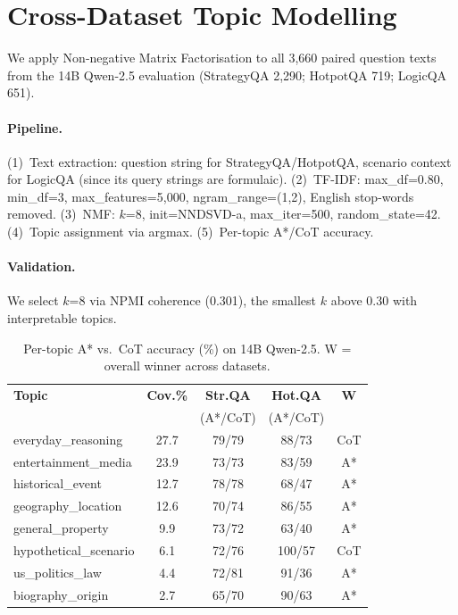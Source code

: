 \documentclass[11pt]{article}
\begin{document}
{%


\section{Cross-Dataset Topic Modelling}
\label{app:topics}

We apply Non-negative Matrix Factorisation \cite[NMF;][]{lee1999learning} to all 3,660 paired question texts from the 14B Qwen-2.5 evaluation (StrategyQA 2,290; HotpotQA 719; LogicQA 651).

\paragraph{Pipeline.} (1)~Text extraction: question string for StrategyQA/HotpotQA, scenario context for LogicQA (since its query strings are formulaic). (2)~TF-IDF: max\_df=0.80, min\_df=3, max\_features=5,000, ngram\_range=(1,2), English stop-words removed. (3)~NMF: $k$=8, init=NNDSVD-a, max\_iter=500, random\_state=42. (4)~Topic assignment via argmax. (5)~Per-topic A*/CoT accuracy.

\paragraph{Validation.} We select $k$=8 via NPMI coherence (0.301), the smallest $k$ above 0.30 with interpretable topics.

\begin{table}[ht]
\centering
\small
\setlength{\tabcolsep}{3pt}
\begin{tabular}{lcccc}
\toprule
\textbf{Topic} & \textbf{Cov.\%} & \textbf{Str.QA} & \textbf{Hot.QA} & \textbf{W} \\
& & (A*/CoT) & (A*/CoT) & \\
\midrule
everyday\_reasoning & 27.7 & 79/79 & 88/73 & CoT \\
entertainment\_media & 23.9 & 73/73 & 83/59 & A* \\
historical\_event & 12.7 & 78/78 & 68/47 & A* \\
geography\_location & 12.6 & 70/74 & 86/55 & A* \\
general\_property & 9.9 & 73/72 & 63/40 & A* \\
hypothetical\_scenario & 6.1 & 72/76 & 100/57 & CoT \\
us\_politics\_law & 4.4 & 72/81 & 91/36 & A* \\
biography\_origin & 2.7 & 65/70 & 90/63 & A* \\
\bottomrule
\end{tabular}
\caption{Per-topic A* vs.\ CoT accuracy (\%) on 14B Qwen-2.5. W = overall winner across datasets.}
\label{tab:topic_results}
\end{table}

}
\end{document}
